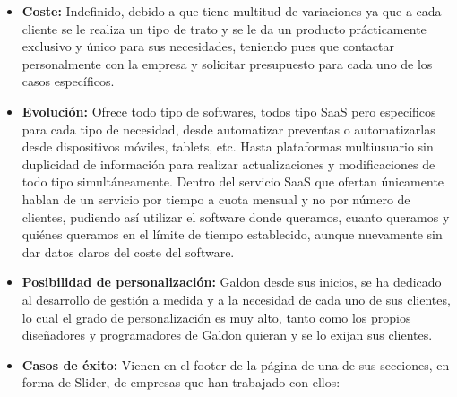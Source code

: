 \documentclass{article}
\begin{document}
\begin{itemize}

	\item \textbf{Coste:} Indefinido, debido a que tiene multitud de variaciones ya que a cada cliente se le realiza un tipo de trato y se le da un producto prácticamente exclusivo y único para sus necesidades, teniendo pues que contactar personalmente con la empresa y solicitar presupuesto para cada uno de los casos específicos. 
	\item \textbf{Evolución:} Ofrece todo tipo de softwares, todos tipo SaaS pero específicos para cada tipo de necesidad, desde automatizar preventas o automatizarlas desde dispositivos móviles, tablets, etc. Hasta plataformas multiusuario sin duplicidad de información para realizar actualizaciones y modificaciones de todo tipo simultáneamente. Dentro del servicio SaaS que ofertan únicamente hablan de un servicio por tiempo a cuota mensual y no por número de clientes, pudiendo así utilizar el software donde queramos, cuanto queramos y quiénes queramos en el límite de tiempo establecido, aunque nuevamente sin dar datos claros del coste del software.
	\item \textbf{Posibilidad de personalización:} Galdon desde sus inicios, se ha dedicado al desarrollo de gestión a medida y a la necesidad de cada uno de sus clientes, lo cual el grado de personalización es muy alto, tanto como los propios diseñadores y programadores de Galdon quieran y se lo exijan sus clientes. 
	\item \textbf{Casos de éxito:} Vienen en el footer de la página de una de sus secciones, en forma de Slider, de empresas que han trabajado con ellos:
	

\end{itemize}
\end{document}
